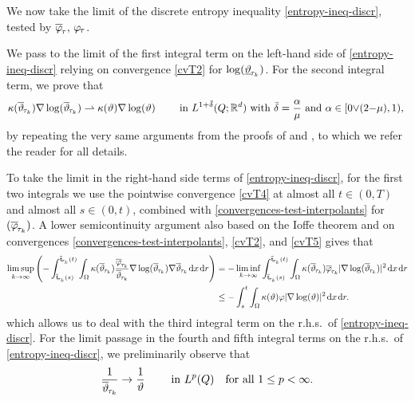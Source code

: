 \documentclass[a4paper,10pt,reqno]{amsart}
\numberwithin{equation}{section}
\newcommand{\R}{\mathbb{R}}
\numberwithin{equation}{section}
\newcommand{\weakto}{\rightharpoonup} %
\def\dd{\;\!\mathrm{d}} %
\newcommand{\teta}{\vartheta}
\newcommand{\piecewiseConstant}[2]{\overline{#1}_{\kern-1pt#2}}
\newcommand{\pwc}{\piecewiseConstant}
\newcommand{\upiecewiseConstant}[2]{\underline{#1}_{\kern-1pt#2}}
\newcommand{\upwc}{\upiecewiseConstant}
\newcommand{\piecewiseLinear}[2]{{#1}_{\kern-1pt#2}}
\newcommand{\pwl}{\piecewiseLinear}
\newcommand{\condu}{\kappa}
\newcommand{\EEE}{\color{black}}
\newcommand{\MMM}{\color{black}}%
\begin{document}
    We now take the limit of 
     the discrete entropy inequality \eqref{entropy-ineq-discr},
     tested by  $\pwc \varphi\tau, \, \pwl \varphi\tau$.
     \par
      We pass to the limit of the first integral term on the left-hand side of
        \eqref{entropy-ineq-discr} relying on convergence \eqref{cvT2} for $\log(\upwc\teta{\tau_k})$.
For the second integral term, 
we  prove that 
\begin{equation}
\label{weak-nabla-logteta}
\condu (\pwc\teta{\tau_k}) \nabla \log(\pwc\teta{\tau_k}) \weakto 
\condu(\teta) \nabla \log(\teta) \qquad \text{ in } 
  L^{1+\bar\delta}(Q;\R^d)   \text{ with   $ \bar\delta = \frac{\alpha}\mu $ 
and  \MMM $\alpha \in [0{\vee}(2{-}\mu), 1)$, \EEE}  \end{equation}
 by repeating the very same arguments from the proofs
of \cite[Thm.\ 1]{Rocca-Rossi} and \cite[Thm.\ 1]{Rossi2016}, to which we refer the reader for all details. 
\par
To take the limit in the right-hand side terms of
 \eqref{entropy-ineq-discr}, for the first two integrals we use
 the pointwise
  convergence \eqref{cvT4}  at almost all $t\in (0,T)$ and almost all $s\in (0,t)$,  combined with \eqref{convergences-test-interpolants} for 
  $(\pwc \varphi{\tau_k})$.
   A lower semicontinuity argument also based on the Ioffe theorem \cite{Ioff77LSIF} and on convergences \eqref{convergences-test-interpolants},   \eqref{cvT2},   and \eqref{cvT5} gives that
\[
\begin{aligned} 
\limsup_{k\to\infty} \left(  -  \int_{\pwc{\mathsf{t}}{\tau_k}(s)}^{\pwc{\mathsf{t}}{\tau_k}(t)}  \int_\Omega \condu(\pwc \teta{\tau_k}) \frac{\pwc\varphi{\tau_k}}{\pwc \teta{\tau_k}}
\nabla \log(\pwc \teta{\tau_k})  \nabla \pwc \teta{\tau_k} \dd x \dd r \right) 
 & = - \liminf_{k\to\infty} \int_{\pwc{\mathsf{t}}{\tau_k}(s)}^{\pwc{\mathsf{t}}{\tau_k}(t)}  \int_\Omega \condu(\pwc \teta{\tau_k}) \pwc\varphi{\tau_k} | \nabla  \log(\pwc \teta{\tau_k}) |^2 \dd x \dd r
\\
  & \leq  -  \int_s^t \int_\Omega \condu(\teta) \varphi
|\nabla \log(\teta)|^2\dd x \dd r.
\end{aligned}
\] 
which allows us to deal with  the third integral term on the r.h.s.\ of   \eqref{entropy-ineq-discr}. 
For the limit passage in the  fourth and fifth integral terms on the r.h.s.\ of 
 \eqref{entropy-ineq-discr}, we preliminarily observe that  
 \begin{equation}
 \label{strong-1-teta}
 \frac1{\pwc\teta{\tau_k}} \to \frac1\teta \qquad \text{ in } L^p(Q) \quad \text{for all } 1 \leq p<\infty.
\end{equation}
\end{document}
